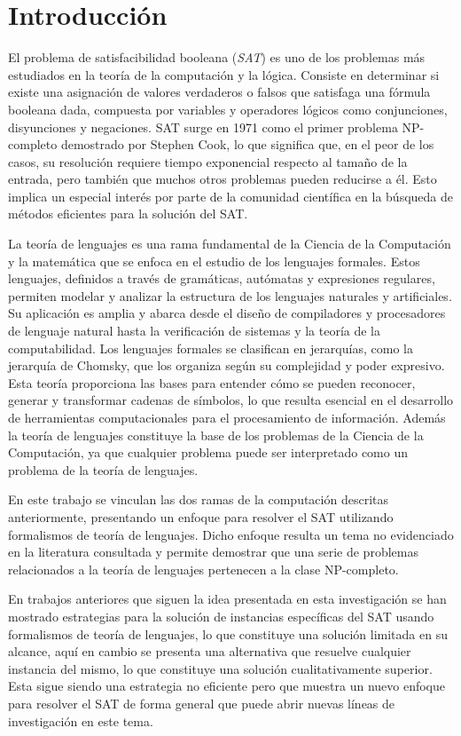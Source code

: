 \chapter*{Introducción}
\label{chap:introduction}


El problema de satisfacibilidad booleana (\textit{SAT}) es uno de los problemas más estudiados en la teoría de la computación y la lógica.
Consiste en determinar si existe una asignación de valores verdaderos o falsos que satisfaga una fórmula booleana dada, compuesta
por variables y operadores lógicos como conjunciones, disyunciones y negaciones. SAT surge en 1971 como el primer problema NP-completo demostrado por
Stephen Cook,
lo que significa que, en el peor de los casos, su resolución requiere tiempo exponencial respecto al
tamaño de la entrada, pero también que muchos otros problemas pueden reducirse a él. Esto
implica un especial interés por parte de la comunidad científica en la búsqueda de métodos eficientes para la solución
del SAT.

La teoría de lenguajes es una rama fundamental de la Ciencia de la Computación y la matemática que se
enfoca en el estudio de los lenguajes formales. Estos lenguajes, definidos a través de gramáticas,
autómatas y expresiones regulares, permiten modelar y analizar la estructura de los lenguajes naturales y
artificiales. Su aplicación es amplia y abarca desde el diseño de compiladores y procesadores de lenguaje
natural hasta la verificación de sistemas y la teoría de la computabilidad. Los lenguajes formales se
clasifican en jerarquías, como la jerarquía de Chomsky, que los organiza según su complejidad y poder
expresivo. Esta teoría proporciona las bases para entender cómo se pueden reconocer, generar y transformar
cadenas de símbolos, lo que resulta esencial en el desarrollo de herramientas computacionales para
el procesamiento de información. Además la teoría de lenguajes constituye la base de los problemas de la Ciencia
de la Computación, ya que cualquier problema puede ser interpretado como un problema de la teoría de lenguajes.

En este trabajo se vinculan las dos ramas de la computación descritas anteriormente, presentando un enfoque para resolver el SAT
utilizando formalismos de teoría de lenguajes. Dicho enfoque resulta un tema no evidenciado en la literatura consultada
y permite demostrar que una serie de problemas relacionados a la teoría de lenguajes pertenecen a la clase NP-completo.

En trabajos anteriores que siguen la idea presentada en esta investigación se han mostrado estrategias para la solución
de instancias específicas del SAT usando formalismos de teoría de lenguajes, lo que constituye una solución limitada en su alcance,
aquí en cambio se presenta una alternativa que resuelve cualquier instancia del mismo, lo que constituye una solución
cualitativamente superior. Esta sigue siendo una estrategia no eficiente pero que
muestra un nuevo enfoque para resolver el SAT de forma general que puede abrir nuevas líneas de investigación en este tema.

